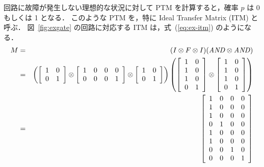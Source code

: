 回路に故障が発生しない理想的な状況に対して PTM を計算すると，確率 $p$ は 0 もしくは 1 となる．
このような PTM を，特に Ideal Transfer Matrix (ITM) と呼ぶ．
図~\ref{fig:exgate} の回路に対応する ITM は，式~(\ref{eq:ex-itm}) のようになる．
\begin{eqnarray}
  M &=& (I \otimes F \otimes I)({\it AND} \otimes {\it AND}) \label{eq:ex-itm}\\
    &=& \left(
    \left[
    \begin{array}{cccc}
      1 & 0\\
      0 & 1\\
    \end{array}
    \right]
    \otimes
    \left[
    \begin{array}{cccc}
      1 & 0 & 0 & 0\\
      0 & 0 & 0 & 1
    \end{array}
    \right]
    \otimes
    \left[
    \begin{array}{cccc}
      1 & 0\\
      0 & 1\\
    \end{array}
    \right]
    \right)
    \left(
    \left[
    \begin{array}{cccc}
      1 & 0\\
      1 & 0\\
      1 & 0\\
      0 & 1\\
    \end{array}
    \right]
    \otimes
    \left[
    \begin{array}{cccc}
      1 & 0\\
      1 & 0\\
      1 & 0\\
      0 & 1\\
    \end{array}
    \right]
    \right) \nonumber \\
    &=& \left[
    \begin{array}{cccc}
      1 & 0 & 0 & 0\\
      1 & 0 & 0 & 0\\
      1 & 0 & 0 & 0\\
      0 & 1 & 0 & 0\\
      1 & 0 & 0 & 0\\
      1 & 0 & 0 & 0\\
      0 & 0 & 1 & 0\\
      0 & 0 & 0 & 1
    \end{array}
    \right] \nonumber
\end{eqnarray}

